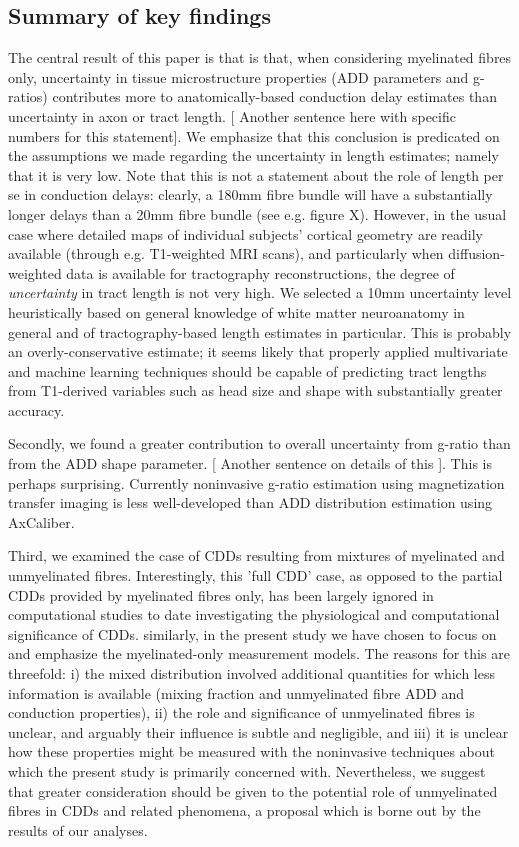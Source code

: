 \subsection{Summary of key findings}

The central result of this paper is that is that, when considering myelinated fibres only, uncertainty in tissue microstructure properties (ADD parameters and g-ratios) contributes more to anatomically-based conduction delay estimates than uncertainty in axon or tract length. [ Another sentence here with specific numbers for this statement]. We emphasize that this conclusion is predicated on the assumptions we made regarding the uncertainty in length estimates; namely that it is very low. Note that this is not a statement about the role of length per se in conduction delays: clearly, a 180mm fibre bundle will have a substantially longer delays than a 20mm fibre bundle (see e.g. figure X). However, in the usual case where detailed maps of individual subjects' cortical geometry are readily available (through e.g. T1-weighted MRI scans), and particularly when diffusion-weighted data is available for tractography reconstructions, the degree of \textit{uncertainty} in tract length is not very high. We selected a 10mm uncertainty level heuristically based on general knowledge of white matter neuroanatomy in general and of tractography-based length estimates in particular. This is probably an overly-conservative estimate; it seems likely that properly applied multivariate and machine learning techniques should be capable of predicting tract lengths from T1-derived variables such as head size and shape with substantially greater accuracy. 

Secondly, we found a greater contribution to overall uncertainty from g-ratio than from the ADD shape parameter. [ Another sentence on details of this ]. This is perhaps surprising. Currently noninvasive g-ratio estimation using magnetization transfer imaging is less well-developed than ADD distribution estimation using AxCaliber. 

Third, we examined the case of CDDs resulting from mixtures of myelinated and unmyelinated fibres. Interestingly, this 'full CDD' case, as opposed to the partial CDDs provided by myelinated fibres only, has been largely ignored in computational studies to date investigating the physiological and computational significance of CDDs. similarly, in the present study we have chosen to focus on and emphasize the myelinated-only measurement models. The reasons for this are threefold: i) the mixed distribution involved additional quantities for which less information is available (mixing fraction and unmyelinated fibre ADD and conduction properties), ii) the role and significance of unmyelinated fibres is unclear, and arguably their influence is subtle and negligible, and iii) it is unclear how these properties might be measured with the noninvasive techniques about which the present study is primarily concerned with. Nevertheless, we suggest that greater consideration should be given to the potential role of unmyelinated fibres in CDDs and related phenomena, a proposal which is borne out by the results of our analyses. 

